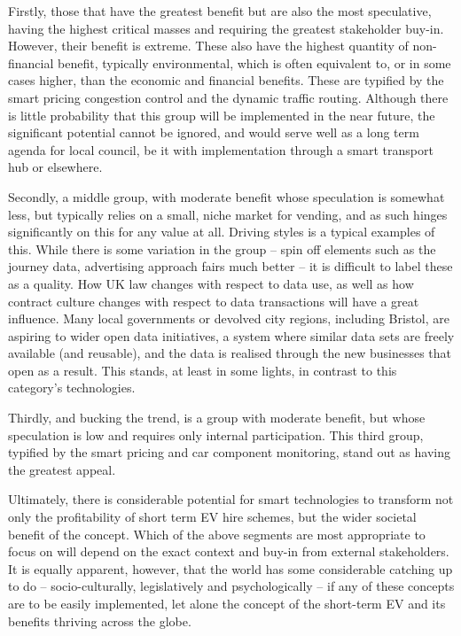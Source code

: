 \documentclass[conference]{IEEEtran}
\begin{document}
\begin{compactitem}
\item Firstly, those that have the greatest benefit but are also the
  most speculative, having the highest critical masses and requiring
  the greatest stakeholder buy-in. However, their benefit is
  extreme. These also have the highest quantity of non-financial
  benefit, typically environmental, which is often equivalent to, or
  in some cases higher, than the economic and financial benefits. These
  are typified by the smart pricing congestion control and the dynamic
  traffic routing. Although there is little probability that this
  group will be implemented in the near future, the significant potential
  cannot be ignored, and would serve well as a long term agenda for
  local council, be it with implementation through a smart transport hub or
  elsewhere.
\item Secondly, a middle group, with moderate benefit whose
  speculation is somewhat less, but typically relies on a small, niche
  market for vending, and as such hinges significantly on this for any
  value at all. Driving styles is a typical examples of this. While
  there is some variation in the group -- spin off elements such as the
  journey data, advertising approach fairs much better -- it is
  difficult to label these as a quality. How UK law changes with respect
  to data use, as well as how contract culture changes with respect to
  data transactions will have a great influence. Many local
  governments or devolved city regions, including Bristol, are
  aspiring to wider open data initiatives, a
  system where similar data sets are freely available (and reusable),
  and the data is realised through the new businesses that open as a result. This
  stands, at least in some lights, in contrast to this category's
  technologies. 
\item Thirdly, and bucking the trend, is a group with moderate
  benefit, but whose speculation is low and requires only internal
  participation. This third group, typified by the smart pricing and
  car component monitoring, stand out as having the greatest
  appeal. 
\end{compactitem}

Ultimately, there is considerable potential for smart technologies to
transform not only the profitability of short term EV hire schemes,
but the wider societal benefit of the concept. Which of the above
segments are most appropriate to focus on will depend on the exact
context and buy-in from external stakeholders. It is equally apparent,
however, that the world has some considerable catching up to do --
socio-culturally, legislatively and psychologically -- if any of these
concepts are to be easily implemented, let alone the concept of the
short-term EV and its benefits thriving across the globe.
\end{document}
